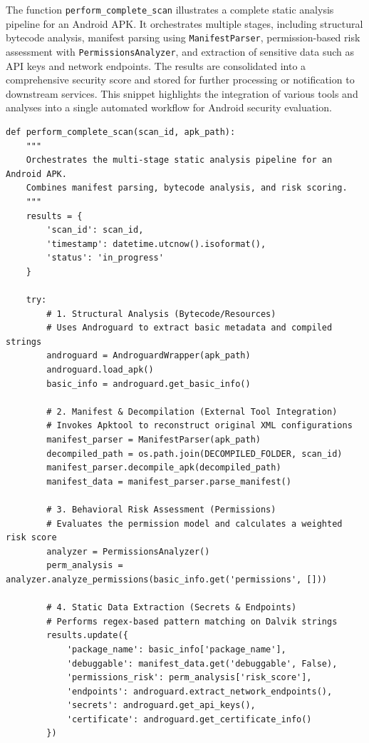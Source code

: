 \documentclass[preprint,12pt, a4paper]{elsarticle}
\begin{document}
The function \texttt{perform\_complete\_scan} illustrates a complete static analysis pipeline for an Android APK. 
It orchestrates multiple stages, including structural bytecode analysis, manifest parsing using \texttt{ManifestParser}, 
permission-based risk assessment with \texttt{PermissionsAnalyzer}, and extraction of sensitive data such as API keys and network endpoints. 
The results are consolidated into a comprehensive security score and stored for further processing or notification to downstream services. 
This snippet highlights the integration of various tools and analyses into a single automated workflow for Android security evaluation.

\begin{lstlisting}[style=pythonStyle]
def perform_complete_scan(scan_id, apk_path):
    """
    Orchestrates the multi-stage static analysis pipeline for an Android APK.
    Combines manifest parsing, bytecode analysis, and risk scoring.
    """
    results = {
        'scan_id': scan_id,
        'timestamp': datetime.utcnow().isoformat(),
        'status': 'in_progress'
    }

    try:
        # 1. Structural Analysis (Bytecode/Resources)
        # Uses Androguard to extract basic metadata and compiled strings
        androguard = AndroguardWrapper(apk_path)
        androguard.load_apk()
        basic_info = androguard.get_basic_info()

        # 2. Manifest & Decompilation (External Tool Integration)
        # Invokes Apktool to reconstruct original XML configurations
        manifest_parser = ManifestParser(apk_path)
        decompiled_path = os.path.join(DECOMPILED_FOLDER, scan_id)
        manifest_parser.decompile_apk(decompiled_path)
        manifest_data = manifest_parser.parse_manifest()

        # 3. Behavioral Risk Assessment (Permissions)
        # Evaluates the permission model and calculates a weighted risk score
        analyzer = PermissionsAnalyzer()
        perm_analysis = analyzer.analyze_permissions(basic_info.get('permissions', []))

        # 4. Static Data Extraction (Secrets & Endpoints)
        # Performs regex-based pattern matching on Dalvik strings
        results.update({
            'package_name': basic_info['package_name'],
            'debuggable': manifest_data.get('debuggable', False),
            'permissions_risk': perm_analysis['risk_score'],
            'endpoints': androguard.extract_network_endpoints(),
            'secrets': androguard.get_api_keys(),
            'certificate': androguard.get_certificate_info()
        })


\end{lstlisting}
\end{document}
